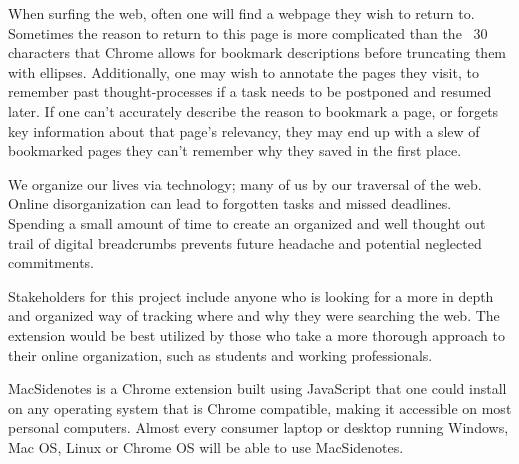 \documentclass{article}
\begin{document}
	\begin{flushleft}
		
		When surfing the web, often one will find a webpage they wish to return to. 
		Sometimes the reason to return to this page is more complicated than the ~30 
		characters that Chrome allows for bookmark descriptions before truncating them 
		with ellipses. Additionally, one may wish to annotate the pages they visit, to 
		remember past thought-processes if a task needs to be postponed and resumed 
		later. If one can’t accurately describe the reason to bookmark a page, or forgets key 
		information about that page’s relevancy, they may end up with a slew of bookmarked 
		pages they can’t remember why they saved in the first place.\par
		
		We organize our lives via technology; many of us by our traversal of the web. Online 
		disorganization can lead to forgotten tasks and missed deadlines. Spending a small 
		amount of time to create an organized and well thought out trail of digital 
		breadcrumbs prevents future headache and potential neglected commitments.\par
		
		Stakeholders for this project include anyone who is looking for a more in depth and 
		organized way of tracking where and why they were searching the web. The 
		extension would be best utilized by those who take a more thorough approach to 
		their online organization, such as students and working professionals.\par
		
		MacSidenotes is a Chrome extension built using JavaScript that one could install on 
		any operating system that is Chrome compatible, making it accessible on most 
		personal computers. Almost every consumer laptop or desktop running Windows, 
		Mac OS, Linux or Chrome OS will be able to use MacSidenotes.
		
		
	\end{flushleft}
		
	
	
\end{document}
